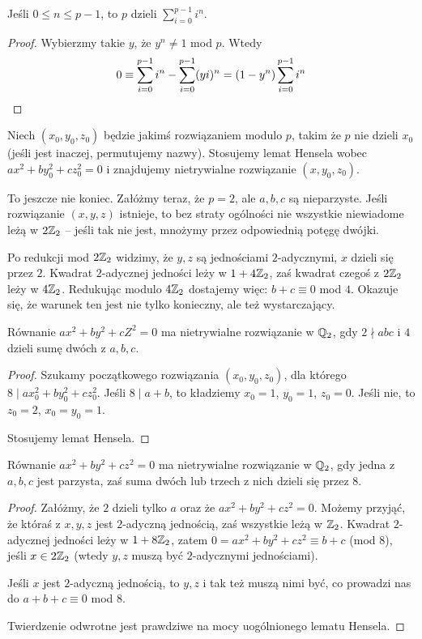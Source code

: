 \begin{lemat}
	Jeśli $0 \le n \le p-1$, to $p$ dzieli $\sum_{i=0}^{p-1} i^n$.
\end{lemat}

\begin{proof}

	Wybierzmy takie $y$, że $y^n \neq 1$ mod $p$.
	Wtedy
	\[
		0 \equiv \sum_{i=0}^{p-1} i^n - \sum_{i=0}^{p-1} (yi)^n = (1-y^n) \sum_{i = 0}^{p-1} i^n \qedhere
	\]
\end{proof}

Niech $(x_0, y_0, z_0)$ będzie jakimś rozwiązaniem modulo $p$, takim że $p$ nie dzieli $x_0$ (jeśli jest inaczej, permutujemy nazwy).
Stosujemy lemat Hensela wobec $ax^2 + by_0^2 + cz_0^2 = 0$ i znajdujemy nietrywialne rozwiązanie $(x, y_0, z_0)$.

To jeszcze nie koniec.
Załóżmy teraz, że $p = 2$, ale $a,b,c$ są nieparzyste.
Jeśli rozwiązanie $(x, y, z)$ istnieje, to bez straty ogólności nie wszystkie niewiadome leżą w $2\mathbb Z_2$ -- jeśli tak nie jest, mnożymy przez odpowiednią potęgę dwójki.

Po redukcji mod $2\mathbb Z_2$ widzimy, że $y,z$ są jednościami $2$-adycznymi, $x$ dzieli się przez $2$.
Kwadrat $2$-adycznej jedności leży w $1+4\mathbb Z_2$, zaś kwadrat czegoś z $2\mathbb Z_2$ leży w $4\mathbb Z_2$. Redukując modulo $4\mathbb Z_2$ dostajemy więc: $b+ c \equiv 0$ mod $4$.
Okazuje się, że warunek ten jest nie tylko konieczny, ale też wystarczający.

\begin{lemat}
	Równanie $ax^2 + by^2 + cZ^2 = 0$ ma nietrywialne rozwiązanie w $\mathbb Q_2$, gdy $2 \nmid abc$ i $4$ dzieli sumę dwóch z $a, b, c$.
\end{lemat}

\begin{proof}
	Szukamy początkowego rozwiązania $(x_0, y_0, z_0)$, dla którego $8 \mid ax_0^2 + by_0^2 + cz_0^2$.
	Jeśli $8 \mid a+b$, to kładziemy $x_0 = 1$, $y_0 = 1$, $z_0= 0$.
	Jeśli nie, to $z_0 = 2$, $x_0 = y_0 = 1$.

	Stosujemy lemat Hensela.
\end{proof}

\begin{lemat}
	Równanie $ax^2 + by^2 + cz^2 = 0$ ma nietrywialne rozwiązanie w $\mathbb Q_2$, gdy jedna z $a, b, c$ jest parzysta, zaś suma dwóch lub trzech z nich dzieli się przez 8.
\end{lemat}

\begin{proof}
	Załóżmy, że $2$ dzieli tylko $a$ oraz że $ax^2 + by^2 + cz^2 = 0$.
	Możemy przyjąć, że któraś z $x, y,z$ jest $2$-adyczną jednością, zaś wszystkie leżą w $\mathbb Z_2$.
	Kwadrat $2$-adycznej jedności leży w $1 + 8 \mathbb Z_2$, zatem $0 = ax^2 + by^2 + cz^2 \equiv b +c$ (mod $8$), jeśli $x \in 2\mathbb Z_2$ (wtedy $y,z$ muszą być $2$-adycznymi jednościami).

	Jeśli $x$ jest $2$-adyczną jednością, to $y, z$ i tak też muszą nimi być, co prowadzi nas do $a+b+c \equiv 0$ mod $8$.
	
	Twierdzenie odwrotne jest prawdziwe na mocy uogólnionego lematu Hensela.
\end{proof}

